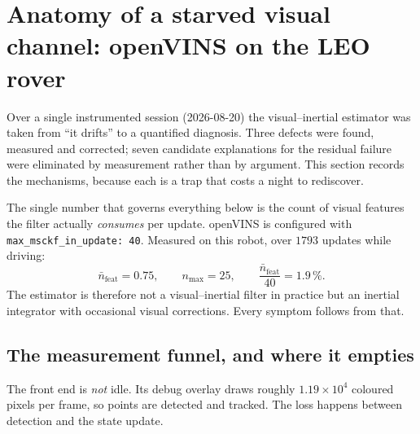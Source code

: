 \section{Anatomy of a starved visual channel: openVINS on the LEO rover}
\label{sec:ovstarvation}

Over a single instrumented session (2026-08-20) the visual--inertial
estimator was taken from ``it drifts'' to a quantified diagnosis. Three
defects were found, measured and corrected; seven candidate explanations for
the residual failure were eliminated by measurement rather than by argument.
This section records the mechanisms, because each is a trap that costs a night
to rediscover.

The single number that governs everything below is the count of visual
features the filter actually \emph{consumes} per update. openVINS is
configured with \texttt{max\_msckf\_in\_update: 40}. Measured on this robot,
over $1793$ updates while driving:
\begin{equation}
\bar{n}_{\mathrm{feat}} = 0.75,
\qquad
n_{\max} = 25,
\qquad
\frac{\bar{n}_{\mathrm{feat}}}{40} = 1.9\,\%.
\label{eq:featstarve}
\end{equation}
The estimator is therefore not a visual--inertial filter in practice but an
inertial integrator with occasional visual corrections. Every symptom follows
from that.

\subsection{The measurement funnel, and where it empties}
\label{sec:funnel}

The front end is \emph{not} idle. Its debug overlay draws roughly
$1.19\times10^{4}$ coloured pixels per frame, so points are detected and
tracked. The loss happens between detection and the state update.


